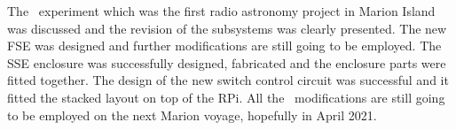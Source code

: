 The \prizm\ experiment which was the first radio astronomy project in Marion Island was discussed and the revision of the subsystems was clearly presented. The new FSE was designed and further modifications are still going to be employed. The SSE enclosure was successfully designed, fabricated and the enclosure parts were fitted together. The design of the new switch control circuit was successful and it fitted the stacked layout on top of the RPi. All the \prizm\ modifications are still going to be employed on the next Marion voyage, hopefully in April 2021. 
